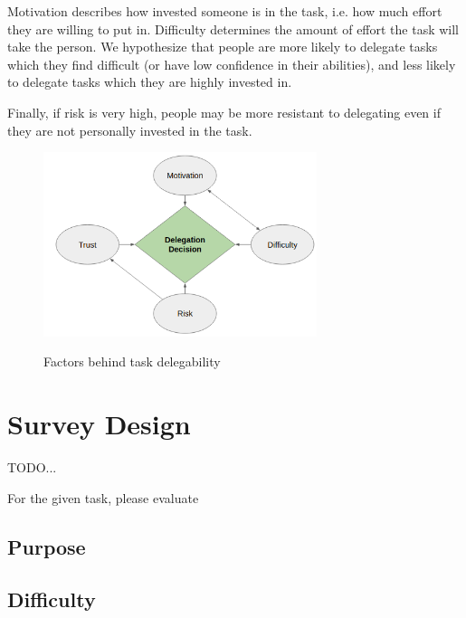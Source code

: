 \documentclass[letterpaper]{article} %
\begin{document}
Motivation describes how invested someone is in the task, i.e. how much effort they are willing to put in. Difficulty determines the amount of effort the task will take the person. We hypothesize that people are more likely to delegate tasks which they find difficult (or have low confidence in their abilities), and less likely to delegate tasks which they are highly invested in. 

Finally, if risk is very high, people may be more resistant to delegating even if they are not personally invested in the task.

\begin{figure}[h]
  \centering
  \includegraphics[width=8cm]{model-1.png}
  \label{1}
  \caption{Factors behind task delegability}
\end{figure}


\section{Survey Design}
TODO...

For the given task, please evaluate 
\subsection{Purpose}
\subsection{Difficulty}
\end{document}
